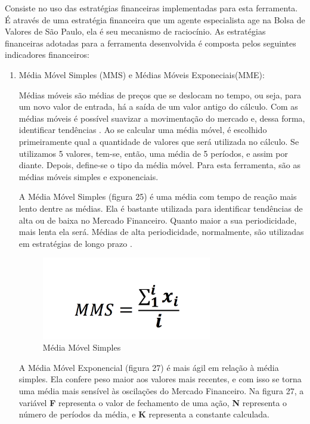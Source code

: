 \begin{description}
\begin{itemize}
Consiste no uso das estratégias financeiras implementadas para esta ferramenta. É através de uma estratégia financeira que um agente especialista age na Bolsa de Valores de São Paulo, ela é seu mecanismo de raciocínio. As estratégias financeiras adotadas para a ferramenta desenvolvida é composta pelos seguintes indicadores financeiros: 

\begin{enumerate}
\item Média Móvel Simples (MMS) e Médias Móveis Exponeciais(MME):\newline

Médias móveis são médias de preços que se deslocam no tempo, ou seja, para um novo valor de entrada, há a saída de um valor antigo do cálculo. Com as médias móveis é possível suavizar a movimentação do mercado e, dessa forma, identificar tendências \cite[p.68]{matsura2006}. Ao se calcular uma média móvel, é escolhido primeiramente qual a quantidade de valores que será utilizada no cálculo. Se utilizamos 5 valores, tem-se, então, uma média de 5 períodos, e assim por diante. Depois, define-se o tipo da média móvel. Para esta ferramenta, são as médias móveis simples e exponenciais.

A Média Móvel Simples (figura 25) é uma média com tempo de reação mais lento dentre as médias. Ela é bastante utilizada para identificar tendências de alta ou de baixa no Mercado Financeiro. Quanto maior a sua periodicidade, mais lenta ela será. Médias de alta periodicidade, normalmente, são utilizadas em estratégias de longo prazo \cite[p. 69]{matsura2006}.

\begin{figure}[H]
\centering
\label{f25}
\includegraphics[width=0.7\textwidth]{figuras/f22}
\caption{Média Móvel Simples}
\end{figure}
\FloatBarrier


A Média Móvel Exponencial (figura 27) é mais ágil em relação à média simples. Ela confere peso maior aos valores mais recentes, e com isso se torna uma média mais sensível às oscilações do Mercado Financeiro. Na figura 27, a variável \textbf{F} representa o valor de fechamento de uma ação, \textbf{N} representa o número de períodos da média, e \textbf{K} representa a constante calculada.


\end{enumerate}
\end{itemize}
\end{description}
